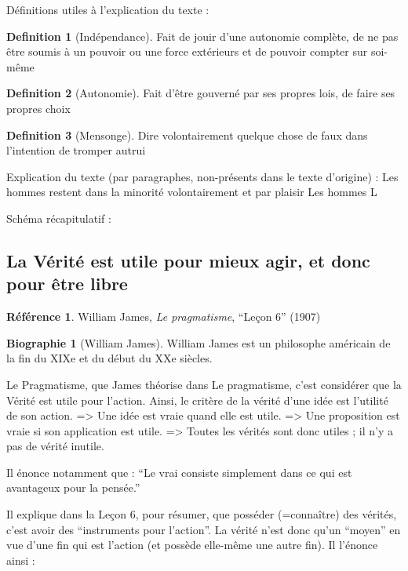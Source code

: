 \documentclass[french]{book}
\theoremstyle{definition}
\newtheorem*{dfn}{Definition}
\newtheorem*{refe}{Référence}
\newtheorem*{bio}{Biographie}
\begin{document}
Définitions utiles à l'explication du texte : 

\begin{dfn}[Indépendance]
Fait de jouir d'une autonomie complète, de ne pas être soumis à un pouvoir ou une force extérieurs et de pouvoir compter sur soi-même
\end{dfn}


\begin{dfn}[Autonomie] 
Fait d'être gouverné par ses propres lois, de faire ses propres choix
\end{dfn}


\begin{dfn}[Mensonge]
Dire volontairement quelque chose de faux dans l'intention de tromper autrui
\end{dfn}


Explication du texte (par paragraphes, non-présents dans le texte d'origine) :
Les hommes restent dans la minorité volontairement et par plaisir
Les hommes
L

Schéma récapitulatif :

\subsection{La Vérité est utile pour mieux agir, et donc pour être libre}

\begin{refe}
	William James, \textit{Le pragmatisme}, “Leçon 6” (1907)
\end{refe}

\begin{bio}[William James]
	William James est un philosophe américain  de la fin du XIXe et du début du XXe siècles.
\end{bio}

Le Pragmatisme, que James théorise dans Le pragmatisme,  c’est considérer que la Vérité est utile pour l’action. Ainsi, le critère de la vérité d’une idée est l’utilité de son action.
=> Une idée est vraie quand elle est utile.
=> Une proposition est vraie si son application est utile.
=> Toutes les vérités sont donc utiles ; il n’y a pas de vérité inutile.

Il énonce notamment que : 
“Le vrai consiste simplement dans ce qui est avantageux pour la pensée.”

Il explique dans la Leçon 6, pour résumer, que posséder (=connaître) des vérités, c’est avoir des “instruments pour l’action”. La vérité n’est donc qu’un “moyen” en vue d’une fin qui est l’action (et possède elle-même une autre fin). Il l’énonce ainsi :
\end{document}
